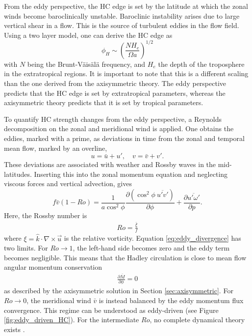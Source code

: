From the eddy perspective, the HC edge is set by the latitude at which the zonal winds become baroclinically unstable. Baroclinic instability arises due to large vertical shear in a flow. This is the source of turbulent eddies in the flow field. Using a two layer model, one can derive the HC edge as \parencite{Held2000}
\begin{equation}
    \phi_H\sim\left(\frac{NH_e}{\Omega a}\right)^{1/2}
\end{equation}
with $N$ being the Brunt-Väisälä frequency, and $H_e$ the depth of the troposphere in the extratropical regions. It is important to note that this is a different scaling than the one derived from the axisymmetric theory. The eddy perspective predicts that the HC edge is set by extratropical parameters, whereas the axisymmetric theory predicts that it is set by tropical parameters.

To quantify HC strength changes from the eddy perspective,  a Reynolds decomposition on the zonal and meridional wind is applied. One obtains the eddies, marked with a prime, as deviations in time from the zonal and temporal mean flow, marked by an overline,
\begin{equation}
    u=\bar{u}+u',\quad v=\bar{v}+v'.
\end{equation}
These deviations are associated with weather and Rossby waves in the mid-latitudes.
Inserting this into the zonal momentum equation and neglecting viscous forces and vertical advection, gives 
\begin{equation}
    \label{eq:eddy_divergence}
    f\bar{v}(1-Ro)=\frac{1}{a\cos^2\phi}\frac{\partial (\cos^2\phi\ \overline{u'v'})}{\partial\phi} + \frac{\partial\overline{u'\omega'}}{\partial p}. 
\end{equation}
Here, the Rossby number is 
\begin{align}
    Ro=\frac{\bar{\xi}}{f}
\end{align}
where $\xi=\hat{k}\cdot\nabla\times\vec{u}$ is the relative vorticity.
Equation \eqref{eq:eddy_divergence} has two limits. For $Ro\to 1$, the left-hand side becomes zero and the eddy term becomes negligible. This means that the Hadley circulation is close to mean flow angular momentum conservation
\begin{align}
    \frac{\partial \overline{M}}{\partial \phi} = 0
\end{align}
as described by the axisymmetric solution in Section \ref{sec:axisymmetric}. For $Ro\to 0$, the meridional wind $\bar{v}$ is instead balanced by the eddy momentum flux convergence. This regime can be understood as eddy-driven (see Figure \ref{fig:eddy_driven_HC}). For the intermediate $Ro$, no complete dynamical theory exists \parencite{schneiderGeneralCirculationAtmosphere2006}.


